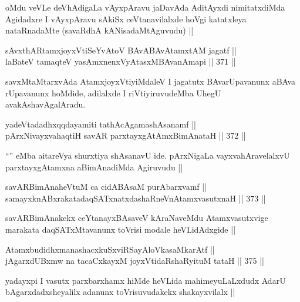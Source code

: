 \begin{artha}
oMdu veVLe deVhAdigaLa vAyxpAravu jaDavAda AditAyxdi nimitatxdiMda Agidadxre I vAyxpAravu sAkiSx ceVtanavilalxde hoVgi katatxleya nataRnadaMte (savaRdhA kANisadaMtAguvudu) ||
\end{artha}

\begin{shl}
sAvxthARtamxjoyxVtiSeYvAtoV BAvABAvAtamxtAM jagatf || \\
laBateV tamaqteV yasAmxnenxVyAtasxMBAvanAmapi ||  371 ||  
\end{shl}

\begin{artha}
savxMtaMtarxvAda AtamxjoyxVtiyiMdaleV I jagatutx BAvarUpavanunx aBAva rUpavanunx hoMdide, adilalxde I riVtiyiruvudeMba UhegU avakAshavAgalAradu.
\end{artha}


\begin{shl}
yadeVtadadhxqqdayamiti tathAcA\s \s gamashAsanamf || \\
pArxNivayxvahaqtiH savAR parxtayxgAtAmxBimAnataH ||  372 ||  
\end{shl}

\begin{artha}
``\stext'' eMba aitareVya shurxtiya shAsanavU ide. pArxNigaLa vayxvahAravelalxvU parxtayxgAtamxna aBimAnadiMda Agiruvudu ||
\end{artha}

\begin{shl}
savARBimAnaheVtuM ca cidABAsaM purA\s barxvamf || \\
samayxknABxrakatadaqSATxnatxdashaRneVnA\s \s tamxvasutxnaH ||  373 ||  
\end{shl}

\begin{artha}
savARBimAnakekx ceYtanayxBAsaveV kAraNaveMdu Atamxvasutxvige marakata daqSATxMtavanunx toVrisi modale heVLidAdxgide ||
\end{artha}


\begin{shl}
AtamxbudidhxmanashacxkuSxviRSayAloVkasaMkarAtf || \\
jAgarxdUBxmw na tacaCxkayxM joyxVtidaRshaRyituM tataH ||  375 ||  
\end{shl}

\begin{artha}
yadayxpi I vasutx parxbarxhamx hiMde heVLida mahimeyuLaLxdudx AdarU bAgarxdadxsheyalilx adanunx toVrisuvudakekx shakayxvilalx ||
\end{artha}

